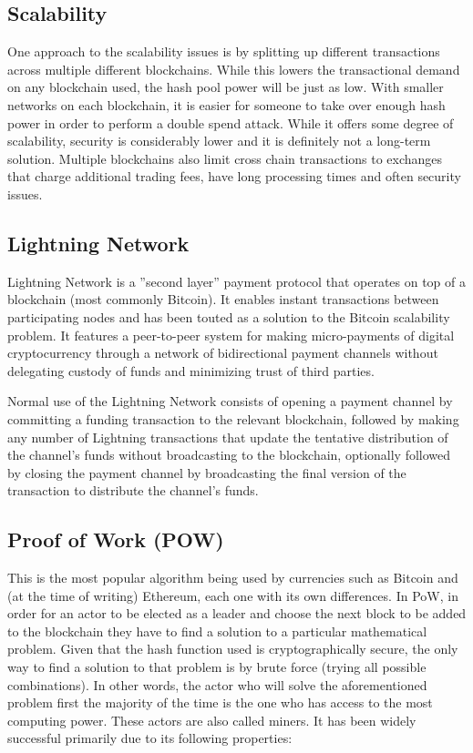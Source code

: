 \subsection{Scalability}

One approach to the scalability issues is by splitting up different transactions across multiple different blockchains. While this lowers the transactional demand on any blockchain used, the hash pool power will be just as low. With smaller networks on each blockchain, it is easier for someone to take over enough hash power in order to perform a double spend attack. While it offers some degree of scalability, security is considerably lower and it is definitely not a long-term solution. Multiple blockchains also limit cross chain transactions to exchanges that charge additional trading fees, have long processing times and often security issues.

\subsection{Lightning Network}

Lightning Network is a ”second layer” payment protocol that operates on top of a blockchain (most commonly Bitcoin). It enables instant transactions between participating nodes and has been touted as a solution to the Bitcoin scalability problem. It features a peer-to-peer system for making micro-payments of digital cryptocurrency through a network of bidirectional payment channels without delegating custody of funds and minimizing trust of third parties.

Normal use of the Lightning Network consists of opening a payment channel by committing a funding transaction to the relevant blockchain, followed by making any number of Lightning transactions that update the tentative distribution of the channel’s funds without broadcasting to the blockchain, optionally followed by closing the payment channel by broadcasting the final version of the transaction to distribute the channel’s funds.

\subsection{Proof of Work (POW)}

This is the most popular algorithm being used by currencies such as Bitcoin and (at the time of writing) Ethereum, each one with its own differences. In PoW, in order for an actor to be elected as a leader and choose the next block to be added to the blockchain they have to find a solution to a particular mathematical problem. Given that the hash function used is cryptographically secure, the only way to find a solution to that problem is by brute force (trying all possible combinations). In other words, the actor who will solve the aforementioned problem first the majority of the time is the one who has access to the most computing power. These actors are also called miners. It has been widely successful primarily due to its following properties:

